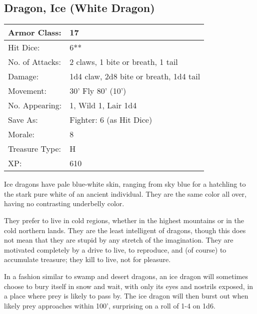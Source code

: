 \documentclass[a4paper,twoside,openany,10pt]{book}
\begin{document}
\begin{multicols}{2}
\subsection*{Dragon, Ice (White Dragon)}\label{dragon-ice-white-dragon}

\begin{tabularx}{0.48\textwidth}{@{}lX@{}}
Armor Class: & 17 \\\hline
Hit Dice: & 6**  \\\hline
No. of Attacks: & 2 claws, 1 bite or breath, 1 tail \\\hline
Damage: & 1d4 claw, 2d8 bite or breath, 1d4 tail \\\hline
Movement: & 30' Fly 80'
(10') \\\hline
No. Appearing: & 1, Wild 1, Lair 1d4 \\\hline
Save As: & Fighter: 6 (as Hit Dice) \\\hline
Morale: & 8 \\\hline
Treasure Type: & H \\\hline
XP: & 610 \\\hline
\end{tabularx}\medskip

Ice dragons have pale blue-white skin, ranging from sky blue for a hatchling to the stark pure white of an ancient individual. They are the same color all over, having no contrasting underbelly color.

They prefer to live in cold regions, whether in the highest mountains or in the cold northern lands. They are the least intelligent of dragons, though this does not mean that they are stupid by any stretch of the imagination. They are motivated completely by a drive to live, to reproduce, and (of course) to accumulate treasure; they kill to live, not for pleasure.

In a fashion similar to swamp and desert dragons, an ice dragon will sometimes choose to bury itself in snow and wait, with only its eyes and nostrils exposed, in a place where prey is likely to pass by. The ice dragon will then burst out when likely prey approaches within 100', surprising on a roll of 1-4 on 1d6.


\end{multicols}
\end{document}
